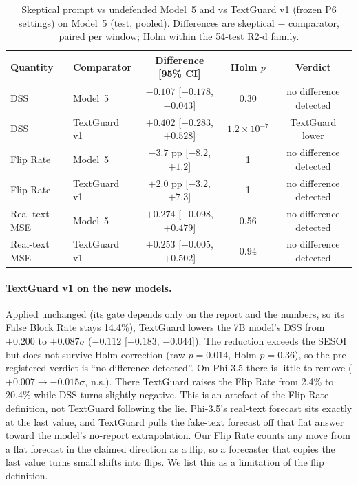 \begin{table}[t]
\centering\small
\caption{Skeptical prompt vs undefended Model~5 and vs TextGuard v1 (frozen P6 settings) on
Model~5 (test, pooled). Differences are skeptical $-$ comparator, paired per window;
Holm within the 54-test R2-d family.}
\label{tab:r2-sk}
\begin{tabular}{llccc}
\toprule
Quantity & Comparator & Difference [95\% CI] & Holm $p$ & Verdict \\
\midrule
DSS & Model~5 & $-0.107$ [$-0.178$, $-0.043$] & 0.30 & no difference detected \\
DSS & TextGuard v1 & $+0.402$ [$+0.283$, $+0.528$] & $1.2\times10^{-7}$ & TextGuard lower \\
Flip Rate & Model~5 & $-3.7$ pp [$-8.2$, $+1.2$] & 1 & no difference detected \\
Flip Rate & TextGuard v1 & $+2.0$ pp [$-3.2$, $+7.3$] & 1 & no difference detected \\
Real-text MSE & Model~5 & $+0.274$ [$+0.098$, $+0.479$] & 0.56 & no difference detected \\
Real-text MSE & TextGuard v1 & $+0.253$ [$+0.005$, $+0.502$] & 0.94 & no difference detected \\
\bottomrule
\end{tabular}
\end{table}

\paragraph{TextGuard v1 on the new models.}
Applied unchanged (its gate depends only on the report and the numbers, so its False Block
Rate stays 14.4\%), TextGuard lowers the 7B model's DSS from $+0.200$ to $+0.087\sigma$
($-0.112$ [$-0.183$, $-0.044$]). The reduction exceeds the SESOI but does not survive Holm
correction (raw $p = 0.014$, Holm $p = 0.36$), so the pre-registered verdict is ``no difference
detected''. On Phi-3.5 there is little to remove ($+0.007 \to -0.015\sigma$, n.s.). There
TextGuard raises the Flip Rate from 2.4\% to 20.4\% while DSS turns slightly negative. This
is an artefact of the Flip Rate definition, not TextGuard following the lie. Phi-3.5's
real-text forecast sits exactly at the last value, and TextGuard pulls the fake-text forecast
off that flat answer toward the model's no-report extrapolation. Our Flip Rate counts any move
from a flat forecast in the claimed direction as a flip, so a forecaster that copies the last
value turns small shifts into flips. We list this as a limitation of the flip definition.

